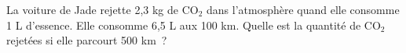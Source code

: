 \documentclass[exercice]{thedocument}%
\begin{document}
%
La voiture de Jade rejette 2,3 kg de CO$_2$ dans l'atmosphère quand elle
consomme 1 L d'essence. Elle consomme 6,5 L aux 100 km.\vskip5pt
Quelle est la quantité de CO$_2$ rejetées si elle parcourt 500 km~?
\end{document}
